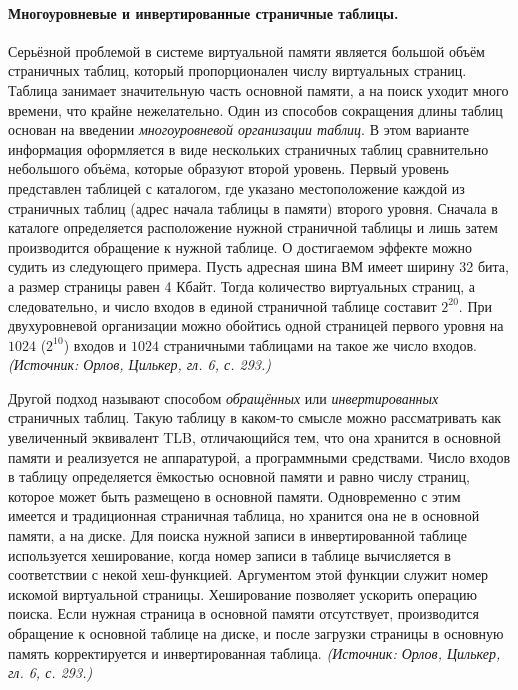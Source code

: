 \documentclass[a4paper,12pt]{article}
\begin{document}
\paragraph{Многоуровневые и инвертированные страничные таблицы.}
Серьёзной проблемой в системе виртуальной памяти является большой объём страничных таблиц, который пропорционален числу виртуальных страниц. Таблица занимает значительную часть основной памяти, а на поиск уходит много времени, что крайне нежелательно. Один из способов сокращения длины таблиц основан на введении \emph{многоуровневой организации таблиц}. В этом варианте информация оформляется в виде нескольких страничных таблиц сравнительно небольшого объёма, которые образуют второй уровень. Первый уровень представлен таблицей с каталогом, где указано местоположение каждой из страничных таблиц (адрес начала таблицы в памяти) второго уровня. Сначала в каталоге определяется расположение нужной страничной таблицы и лишь затем производится обращение к нужной таблице. О достигаемом эффекте можно судить из следующего примера. Пусть адресная шина ВМ имеет ширину 32 бита, а размер страницы равен 4 Кбайт. Тогда количество виртуальных страниц, а следовательно, и число входов в единой страничной таблице составит \(2^{20}\). При двухуровневой организации можно обойтись одной страницей первого уровня на \(1024\) (\(2^{10}\)) входов и \(1024\) страничными таблицами на такое же число входов.
\textit{(Источник: Орлов, Цилькер, гл. 6, с. 293.)}

Другой подход называют способом \emph{обращённых} или \emph{инвертированных} страничных таблиц. Такую таблицу в каком-то смысле можно рассматривать как увеличенный эквивалент TLB, отличающийся тем, что она хранится в основной памяти и реализуется не аппаратурой, а программными средствами. Число входов в таблицу определяется ёмкостью основной памяти и равно числу страниц, которое может быть размещено в основной памяти. Одновременно с этим имеется и традиционная страничная таблица, но хранится она не в основной памяти, а на диске. Для поиска нужной записи в инвертированной таблице используется хеширование, когда номер записи в таблице вычисляется в соответствии с некой хеш-функцией. Аргументом этой функции служит номер искомой виртуальной страницы. Хеширование позволяет ускорить операцию поиска. Если нужная страница в основной памяти отсутствует, производится обращение к основной таблице на диске, и после загрузки страницы в основную память корректируется и инвертированная таблица.
\textit{(Источник: Орлов, Цилькер, гл. 6, с. 293.)}
\end{document}
